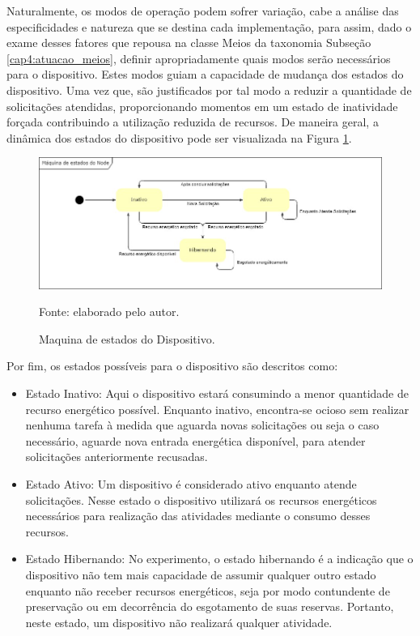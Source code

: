 Naturalmente, os modos de operação podem sofrer variação, cabe a análise das especificidades e natureza que se destina cada implementação, para assim, dado o exame desses fatores que repousa na classe Meios da taxonomia Subseção \ref{cap4:atuacao_meios}, definir apropriadamente quais modos serão necessários para o dispositivo. Estes modos guiam a capacidade de mudança dos estados do dispositivo. Uma vez que, são justificados por tal modo a reduzir a quantidade de solicitações atendidas, proporcionando momentos em um estado de inatividade forçada contribuindo a utilização reduzida de recursos. De maneira geral, a dinâmica dos estados do dispositivo pode ser visualizada na Figura \ref{fig:cap6maquinaestados}. 

\begin{figure}[H]
	\centering
	
	\caption{Maquina de estados do Dispositivo.}
	\label{fig:cap6maquinaestados}
	\noindent\includegraphics[width=0.75\linewidth]{Imagens/cap6/cap6maquinaestados.jpg} 
	
	Fonte: elaborado pelo autor.
\end{figure}

Por fim, os estados possíveis para o dispositivo são descritos como:
\begin{itemize}
	\item Estado Inativo: Aqui o dispositivo estará consumindo a menor quantidade de recurso energético possível. Enquanto inativo, encontra-se ocioso sem realizar nenhuma tarefa à medida que aguarda novas solicitações ou seja o caso necessário, aguarde nova entrada energética disponível, para atender solicitações anteriormente recusadas.
	\item Estado Ativo: Um dispositivo é considerado ativo enquanto atende solicitações. Nesse estado o dispositivo utilizará os recursos energéticos necessários para realização das atividades mediante o consumo desses recursos. 
	\item Estado Hibernando: No experimento, o estado hibernando é a indicação que o dispositivo não tem mais capacidade de assumir qualquer outro estado enquanto não receber recursos energéticos, seja por modo contundente de preservação ou em decorrência do esgotamento de suas reservas. Portanto, neste estado, um dispositivo não realizará qualquer atividade.	
	
\end{itemize}

